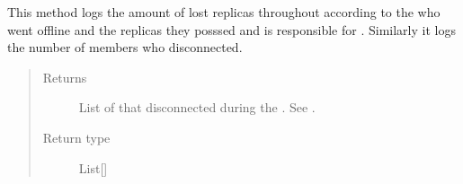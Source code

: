 \documentclass[letterpaper,10pt,english]{sphinxmanual}
\begin{document}
\begin{fulllineitems}
\begin{fulllineitems}
This method logs the amount of lost replicas throughout
{\hyperref[\detokenize{app.domain:app.domain.cluster_groups.Cluster.current_epoch}]{}} according to the {\hyperref[\detokenize{app.domain:app.domain.cluster_groups.Cluster.members}]{}} who went
offline and the
{\hyperref[\detokenize{app.domain.helpers:app.domain.helpers.smart_dataclasses.FileBlockData}]{}}
replicas they posssed and is responsible for
{\hyperref[\detokenize{app.domain:app.domain.cluster_groups.Cluster.set_replication_epoch}]{}}.
Similarly it logs the number of members who disconnected.
\begin{quote}\begin{description}
\item[{Returns}] \leavevmode
List of {\hyperref[\detokenize{app.domain:app.domain.cluster_groups.Cluster.members}]{}} that disconnected during the
{\hyperref[\detokenize{app.domain:app.domain.cluster_groups.Cluster.current_epoch}]{}}. See
{\hyperref[\detokenize{app.domain:app.domain.network_nodes.Node.update_status}]{}}.

\item[{Return type}] \leavevmode
List{[}{\hyperref[\detokenize{app:app.type_hints.NodeType}]{}}{]}

\end{description}\end{quote}

\end{fulllineitems}



\end{fulllineitems}
\end{document}
